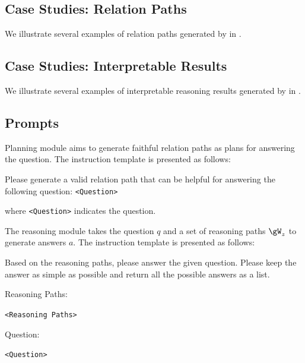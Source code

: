 \subsection{Case Studies: Relation Paths}\label{app:case_rel}
We illustrate several examples of relation paths generated by \ourmethod in .

\subsection{Case Studies: Interpretable Results}\label{app:case_inter}
We illustrate several examples of interpretable reasoning results generated by \ourmethod in .

\subsection{Prompts}\label{app:prompts}

Planning module aims to generate faithful relation paths as plans for answering the question. The instruction template is presented as follows:

\begin{minipage}{0.99\columnwidth}
    \centering
    \begin{tcolorbox}[title=Planning Prompt Template]
        \small
        Please generate a valid relation path that can be helpful for answering the following question: \texttt{<Question>}
    \end{tcolorbox}
    \vspace{1mm}
\end{minipage}
where \texttt{<Question>} indicates the question.

The reasoning module takes the question $q$ and a set of reasoning paths $\gW_z$ to generate answers $a$. The instruction template is presented as follows:

\begin{minipage}{0.99\columnwidth}
    \centering
    \begin{tcolorbox}[title=Reasoning Prompt Template]
        \small
        Based on the reasoning paths, please answer the given question. Please keep the answer as simple as possible and return all the possible answers as a list.

        \vspace{10pt}
        Reasoning Paths:

        \texttt{<Reasoning Paths>}

        \vspace{10pt}
        Question:

        \texttt{<Question>}
    \end{tcolorbox}
\end{minipage}


